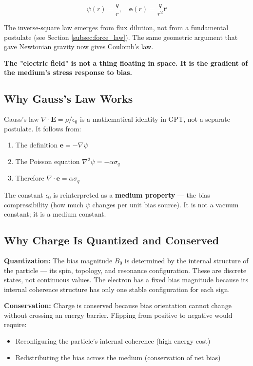 \documentclass[12pt, a4paper]{article}
\begin{document}
\[
\psi(r) = \frac{q}{r}, \quad \mathbf{e}(r) = \frac{q}{r^2} \hat{\mathbf{r}}
\]

The inverse-square law emerges from flux dilution, not from a fundamental postulate (see Section \ref{subsec:force_law}). The same geometric argument that gave Newtonian gravity now gives Coulomb's law.

\textbf{The "electric field" is not a thing floating in space. It is the gradient of the medium's stress response to bias.}

\subsection{Why Gauss's Law Works}
\label{subsec:gauss_law}

Gauss's law \( \nabla \cdot \mathbf{E} = \rho/\epsilon_0 \) is a mathematical identity in GPT, not a separate postulate. It follows from:

\begin{enumerate}
    \item The definition \( \mathbf{e} = -\nabla \psi \)
    \item The Poisson equation \( \nabla^2 \psi = -\alpha \sigma_q \)
    \item Therefore \( \nabla \cdot \mathbf{e} = \alpha \sigma_q \)
\end{enumerate}

The constant \( \epsilon_0 \) is reinterpreted as a \textbf{medium property} — the bias compressibility (how much \( \psi \) changes per unit bias source). It is not a vacuum constant; it is a medium constant.

\subsection{Why Charge Is Quantized and Conserved}
\label{subsec:charge_conservation}

\textbf{Quantization:} The bias magnitude \( B_0 \) is determined by the internal structure of the particle — its spin, topology, and resonance configuration. These are discrete states, not continuous values. The electron has a fixed bias magnitude because its internal coherence structure has only one stable configuration for each sign.

\textbf{Conservation:} Charge is conserved because bias orientation cannot change without crossing an energy barrier. Flipping from positive to negative would require:
\begin{itemize}
    \item Reconfiguring the particle's internal coherence (high energy cost)
    \item Redistributing the bias across the medium (conservation of net bias)
\end{itemize}
\end{document}
